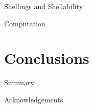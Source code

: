 \documentclass{beamer}
\begin{document}
\begin{frame}{Shellings and Shellability}
\end{frame}
\begin{frame}{Computation}
\end{frame}
\section{Conclusions}
\begin{frame}{Summary}
\end{frame}
\begin{frame}{Acknowledgements}
\end{frame}
\end{document}
